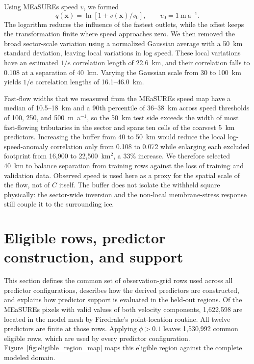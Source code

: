 \documentclass[review,jog]{igs}
\begin{document}
Using MEaSUREs speed $v$, we formed
\begin{equation}
q(\mathbf{x})=\ln\!\left[1+v(\mathbf{x})/v_0\right],\qquad
v_0=1~\mathrm{m~a^{-1}}.
\end{equation}
The logarithm reduces the influence of the fastest outlets, while the offset
keeps the transformation finite where speed approaches zero. We then removed
the broad sector-scale variation using a normalized Gaussian average with a
50~km standard deviation, leaving local variations in log speed. These local
variations have an estimated $1/e$ correlation length of 22.6~km, and their
correlation falls to 0.108 at a separation of 40~km. Varying the Gaussian
scale from 30 to 100~km yields $1/e$ correlation lengths of
16.1--46.0~km.

Fast-flow widths that we measured from the MEaSUREs speed map \citep{https://doi.org/10.5067/pz3nj5rxrh10} have a median of 10.5--18~km and a 90th percentile of 36--38~km across speed thresholds of 100, 250, and 500~m~a$^{-1}$, so the 50~km test side exceeds the width of most fast-flowing tributaries in the sector and spans ten cells of the coarsest 5~km predictors. Increasing the buffer from 40 to 50~km would reduce the local log-speed-anomaly correlation only from 0.108 to 0.072 while enlarging each excluded footprint from 16,900 to 22,500~km$^2$, a 33\% increase. We therefore selected 40~km to balance separation from training rows against the loss of training and validation data. Observed speed is used here as a proxy for the spatial scale of the flow, not of $C$ itself. The buffer does not isolate the withheld square physically: the sector-wide inversion and the non-local membrane-stress response still couple it to the surrounding ice.

\section{Eligible rows, predictor construction, and support}
\label{app:predictor_population}

This section defines the common set of observation-grid rows used across all
predictor configurations, describes how the derived predictors are constructed,
and explains how predictor support is evaluated in the held-out regions. Of the MEaSUREs pixels with valid values of both velocity components, 1,622,598 are located in the model mesh by Firedrake's point-location routine. All twelve predictors
are finite at those rows. Applying $\phi>0.1$ leaves 1,530,992
common eligible rows, which are used by every predictor configuration. Figure~\ref{fig:eligible_region_map} maps this eligible region against the complete modeled domain. 
\end{document}
